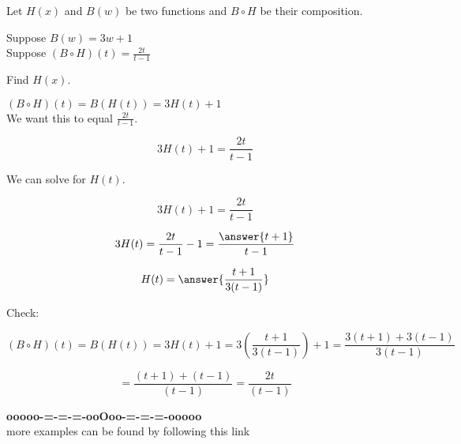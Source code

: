 \documentclass{ximera}
\begin{document}
\begin{example}


Let $H(x)$ and $B(w)$ be two functions and $B \circ H$ be their composition.


Suppose $B(w) = 3w + 1$ \\

Suppose $(B \circ H)(t) = \frac{2t}{t-1}$


Find $H(x)$.



\begin{explanation}




$(B \circ H)(t) =  B(H(t)) = 3 H(t) + 1$ \\


We want this to equal $\frac{2t}{t-1}$.




\[
3 H(t) + 1 = \frac{2t}{t-1}
\]


We can solve for $H(t)$.



\[
3 H(t) + 1 = \frac{2t}{t-1}
\]

\[
3 H(t) = \frac{2t}{t-1} - 1 = \frac{\answer{t+1}}{t-1}
\]

\[
H(t)  = \answer{\frac{t+1}{3(t-1)}}
\]



Check:

\[
(B \circ H)(t) =  B(H(t)) = 3 H(t) + 1 = 3 \left( \frac{t+1}{3(t-1)} \right) + 1 = \frac{3(t+1) + 3(t-1)}{3(t-1)} 
\]


\[
 = \frac{(t+1) + (t-1)}{(t-1)}  = \frac{2t}{(t-1)}
\]



\end{explanation}

\end{example}





















\begin{center}
\textbf{\textcolor{green!50!black}{ooooo-=-=-=-ooOoo-=-=-=-ooooo}} \\

more examples can be found by following this link\\ 

\end{center}
\end{document}
